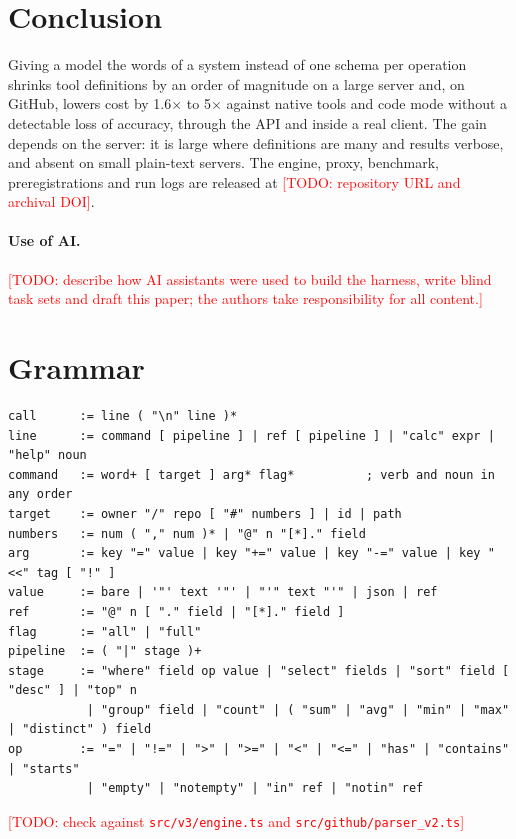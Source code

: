 \documentclass[11pt]{article}
\newcommand{\todo}[1]{\textcolor{red}{[TODO: #1]}}
\begin{document}
\section{Conclusion}
Giving a model the words of a system instead of one schema per operation shrinks tool definitions by an order of magnitude on a large server and, on GitHub, lowers cost by 1.6$\times$ to 5$\times$ against native tools and code mode without a detectable loss of accuracy, through the API and inside a real client. The gain depends on the server: it is large where definitions are many and results verbose, and absent on small plain-text servers. The engine, proxy, benchmark, preregistrations and run logs are released at \todo{repository URL and archival DOI}.

\paragraph{Use of AI.} \todo{describe how AI assistants were used to build the harness, write blind task sets and draft this paper; the authors take responsibility for all content.}




\appendix

\section{Grammar}
\label{app:grammar}
\begin{lstlisting}
call      := line ( "\n" line )*
line      := command [ pipeline ] | ref [ pipeline ] | "calc" expr | "help" noun
command   := word+ [ target ] arg* flag*          ; verb and noun in any order
target    := owner "/" repo [ "#" numbers ] | id | path
numbers   := num ( "," num )* | "@" n "[*]." field
arg       := key "=" value | key "+=" value | key "-=" value | key "<<" tag [ "!" ]
value     := bare | '"' text '"' | "'" text "'" | json | ref
ref       := "@" n [ "." field | "[*]." field ]
flag      := "all" | "full"
pipeline  := ( "|" stage )+
stage     := "where" field op value | "select" fields | "sort" field [ "desc" ] | "top" n
           | "group" field | "count" | ( "sum" | "avg" | "min" | "max" | "distinct" ) field
op        := "=" | "!=" | ">" | ">=" | "<" | "<=" | "has" | "contains" | "starts"
           | "empty" | "notempty" | "in" ref | "notin" ref
\end{lstlisting}
\todo{check against \texttt{src/v3/engine.ts} and \texttt{src/github/parser\_v2.ts}}
\end{document}
